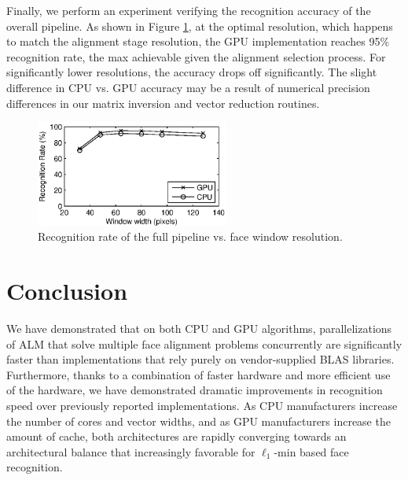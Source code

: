 \documentclass[preprint]{sigplanconf}
\begin{document}
Finally, we perform an experiment verifying the recognition accuracy of the
overall pipeline.  As shown in Figure \ref{fig:accuracy_vs_resolution},
at the optimal resolution, which happens to match the alignment stage
resolution, the GPU implementation reaches 95\% recognition rate, the max
achievable given the alignment selection process.  For significantly lower resolutions,
the accuracy drops off significantly.  The slight difference in CPU vs. GPU
accuracy may be a result of numerical precision differences in our matrix
inversion and vector reduction routines.
\begin{figure}[t!]
\centering
\includegraphics[width=2.5in]{figures/accuracyVsResolution} \vspace{-0.06in}
\caption{Recognition rate of the full pipeline vs. face window resolution.} \vspace{-0.1in}
\label{fig:accuracy_vs_resolution}
\end{figure}

\section{Conclusion}\vspace{-0.06in}
We have demonstrated that on both CPU and GPU algorithms, parallelizations of
ALM that solve multiple face alignment problems concurrently are significantly
faster than implementations that rely purely on vendor-supplied BLAS libraries.
Furthermore, thanks to a combination of faster hardware and more efficient use
of the hardware, we have demonstrated dramatic improvements in recognition
speed over previously reported implementations.
As CPU manufacturers increase the number of cores and vector widths, and as GPU 
manufacturers increase the amount
of cache, both architectures are rapidly converging towards an architectural balance
that increasingly favorable for $\ell_1$-min based face recognition.




\end{document}
